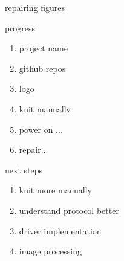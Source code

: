 \documentclass{beamer}
\begin{document}
\begin{frame}{repairing}
figures
\end{frame}

\begin{frame}{progress}
    \begin{enumerate}
        \item project name \emojiCheck
        \item github repos \emojiCheck
        \item logo \emojiCheck
        \item knit manually \emojiCheck
        \item power on ... \emojiFail
        \item repair... \pause \emojiCheck
    \end{enumerate}
\end{frame}

\begin{frame}{next steps}
    \begin{enumerate}
        \item knit more manually
        \item understand protocol better
        \item driver implementation
        \item image processing
    \end{enumerate}
\end{frame}
\end{document}
